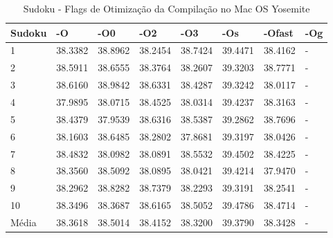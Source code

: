 \begin{table}[!ht]
\centering
\tiny
\caption{Sudoku - Flags de Otimização da Compilação no Mac OS Yosemite}
\label{tab:otimizacao_compilacao:mac:sudoku}
\begin{tabular}{llllllll}
\textbf{Sudoku}         & \textbf{-O}  & \textbf{-O0}   & \textbf{-O2} & \textbf{-O3} & \textbf{-Os} & \textbf{-Ofast} & \textbf{-Og} \\ \toprule
1                       & 38.3382      & 38.8962        & 38.2454      & 38.7424      & 39.4471      & 38.4162         &  -           \\ 
2                       & 38.5911      & 38.6555        & 38.3764      & 38.2607      & 39.3203      & 38.7771         &  -           \\ 
3                       & 38.6160      & 38.9842        & 38.6331      & 38.4287      & 39.3242      & 38.0117         &  -           \\ 
4                       & 37.9895      & 38.0715        & 38.4525      & 38.0314      & 39.4237      & 38.3163         &  -           \\ 
5                       & 38.4379      & 37.9539        & 38.6316      & 38.5387      & 39.2862      & 38.7696         &  -           \\ 
6                       & 38.1603      & 38.6485        & 38.2802      & 37.8681      & 39.3197      & 38.0426         &  -           \\ 
7                       & 38.4832      & 38.0982        & 38.0891      & 38.5532      & 39.4502      & 38.4225         &  -           \\ 
8                       & 38.3560      & 38.5092        & 38.0895      & 38.0421      & 39.4214      & 37.9470         &  -           \\ 
9                       & 38.2962      & 38.8282        & 38.7379      & 38.2293      & 39.3191      & 38.2541         &  -           \\ 
10                      & 38.3496      & 38.3687        & 38.6165      & 38.5052      & 39.4786      & 38.4714         &  -           \\ \bottomrule
Média                   & 38.3618      & 38.5014        & 38.4152      & 38.3200      & 39.3790      & 38.3428         &  -           \\ 
\end{tabular}
\end{table}


